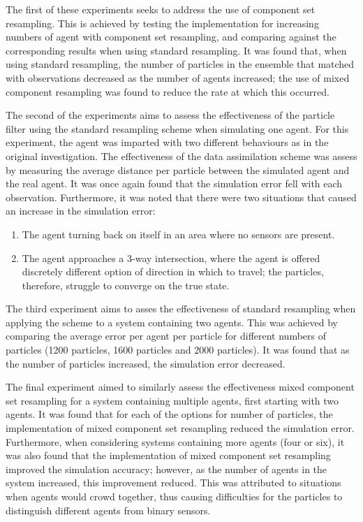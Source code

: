 The first of these experiments seeks to address the use of component set
resampling.
This is achieved by testing the implementation for increasing numbers of agent
with component set resampling, and comparing against the corresponding results
when using standard resampling.
It was found that, when using standard resampling, the number of particles in
the ensemble that matched with observations decreased as the number of agents
increased; the use of mixed component resampling was found to reduce the rate at
which this occurred.

The second of the experiments aims to assess the effectiveness of the particle
filter using the standard resampling scheme when simulating one agent.
For this experiment, the agent was imparted with two different behaviours as in
the original investigation.
The effectiveness of the data assimilation scheme was assess by measuring the
average distance per particle between the simulated agent and the real agent.
It was once again found that the simulation error fell with each observation.
Furthermore, it was noted that there were two situations that caused an increase
in the simulation error:
\begin{enumerate}
    \item The agent turning back on itself in an area where no sensors are
        present.
    \item The agent approaches a 3-way intersection, where the agent is offered
        discretely different option of direction in which to travel; the
        particles, therefore, struggle to converge on the true state.
\end{enumerate}

The third experiment aims to asses the effectiveness of standard resampling when
applying the scheme to a system containing two agents.
This was achieved by comparing the average error per agent per particle for
different numbers of particles (1200 particles, 1600 particles and 2000
particles).
It was found that as the number of particles increased, the simulation error
decreased.

The final experiment aimed to similarly assess the effectiveness mixed component set
resampling for a system containing multiple agents, first starting with two
agents.
It was found that for each of the options for number of particles, the
implementation of mixed component set resampling reduced the simulation error.
Furthermore, when considering systems containing more agents (four or six), it
was also found that the implementation of mixed component set resampling
improved the simulation accuracy; however, as the number of agents in the system
increased, this improvement reduced.
This was attributed to situations when agents would crowd together, thus causing
difficulties for the particles to distinguish different agents from binary
sensors.

